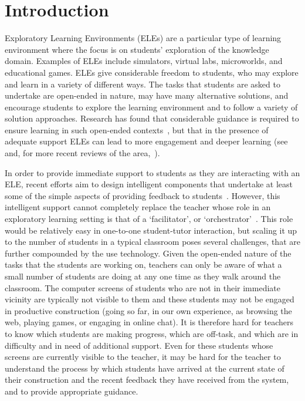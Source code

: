 \section{Introduction}
\label{sec:introduction}

Exploratory Learning Environments (ELEs) are a particular
type of learning environment where the focus is on students'
exploration of the knowledge domain. Examples of ELEs
include simulators, virtual labs, microworlds, and educational
games. ELEs give considerable freedom to students, who may explore and
learn in a variety of different ways.
%
%
The tasks that students are asked to
undertake are open-ended in nature, may have many alternative
solutions, and encourage students to explore the learning
environment and to follow a variety of solution approaches. Research
has found that considerable guidance is required to ensure learning in
such open-ended contexts~\cite{kirschner06,Kynigos92,MayerDiscovery},
but that in the presence of adequate support ELEs can lead to more engagement
and deeper learning (see~\cite{Noss96,JongJoolingen98} and, for more
recent reviews of the area,~\cite{InquiryLearningJoolingen,Healy2010Charting}). 

In order to provide immediate support to students as they are interacting
with an ELE, recent efforts aim to design intelligent components that 
undertake at least some of the simple aspects of providing feedback to 
students~\cite{MiGen-JRPIT,AmersiConati09}. 
However, this intelligent support cannot completely replace the teacher 
whose role in an exploratory learning setting is that 
of a `facilitator', or `orchestrator'~\cite{Trouche2004,Hoyles2004Integration}. 
This role would be relatively easy in one-to-one student-tutor 
interaction, but scaling it up to the number of students in a 
typical classroom poses several challenges,
that are further compounded by the use technology. 
Given the open-ended nature of the tasks that the students are working on,
teachers can only be aware of what a small number of
students are doing at any one time as they walk around the classroom. 
The computer screens of students who are not in their immediate
vicinity are typically not visible to them and these students may not be engaged
in productive construction (going so far, in our own experience, as
browsing the web, playing games, or engaging in online chat). It is
therefore hard for teachers to know which students are making progress,
which are off-task, and which are in difficulty and in need of additional support.
Even for these students whose screens are currently visible to the teacher, 
it may be hard for the teacher to understand the process by which students have
arrived at the current state of their construction and the recent
feedback they have received from the system, and to provide appropriate
guidance. 

